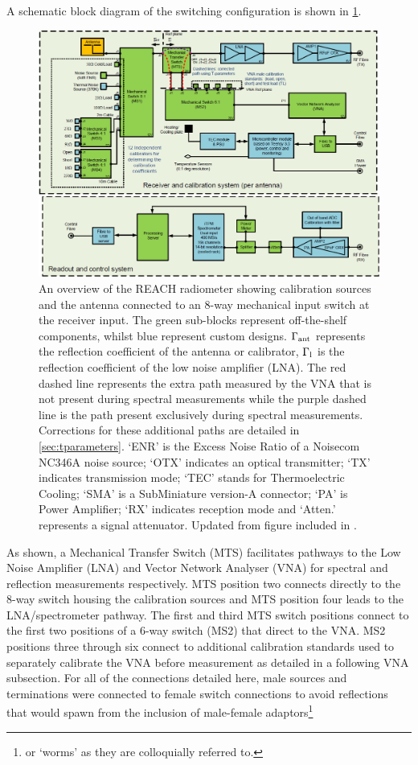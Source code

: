A schematic block diagram of the switching configuration is shown in \cref{fig:overview}.
\begin{figure}
    \includegraphics[width=\columnwidth]{radiometer_v8a}
    \caption{An overview of the REACH radiometer showing calibration sources and the antenna connected to an 8-way mechanical input switch at the receiver input. The green sub-blocks represent off-the-shelf components, whilst blue represent custom designs. $\Gamma_{\mathrm{ant}}$ represents the reflection coefficient of the antenna or calibrator, $\Gamma_{\mathrm{l}}$ is the reflection coefficient of the low noise amplifier (LNA). The red dashed line represents the extra path measured by the VNA that is not present during spectral measurements while the purple dashed line is the path present exclusively during spectral measurements. Corrections for these additional paths are detailed in \cref{sec:tparameters}. ‘ENR’ is the Excess Noise Ratio of a Noisecom NC346A noise source; ‘OTX’ indicates an optical transmitter; ‘TX’ indicates transmission mode; ‘TEC’ stands for Thermoelectric Cooling; ‘SMA’ is a SubMiniature version-A connector; ‘PA’ is Power Amplifier; ‘RX’ indicates reception mode and ‘Atten.’ represents a signal attenuator. Updated from figure included in \citet{reach}.}
    \label{fig:overview}
\end{figure}
As shown, a Mechanical Transfer Switch (MTS) facilitates pathways to the Low Noise Amplifier (LNA) and Vector Network Analyser (VNA) for spectral and reflection measurements respectively. MTS position two connects directly to the 8-way switch housing the calibration sources and MTS position four leads to the LNA/spectrometer pathway. The first and third MTS switch positions connect to the first two positions of a 6-way switch (MS2) that direct to the VNA. MS2 positions three through six connect to additional calibration standards used to separately calibrate the VNA before measurement as detailed in a following VNA subsection. For all of the connections detailed here, male sources and terminations were connected to female switch connections to avoid reflections that would spawn from the inclusion of male-female adaptors\footnote{or ‘worms’ as they are colloquially referred to.}

